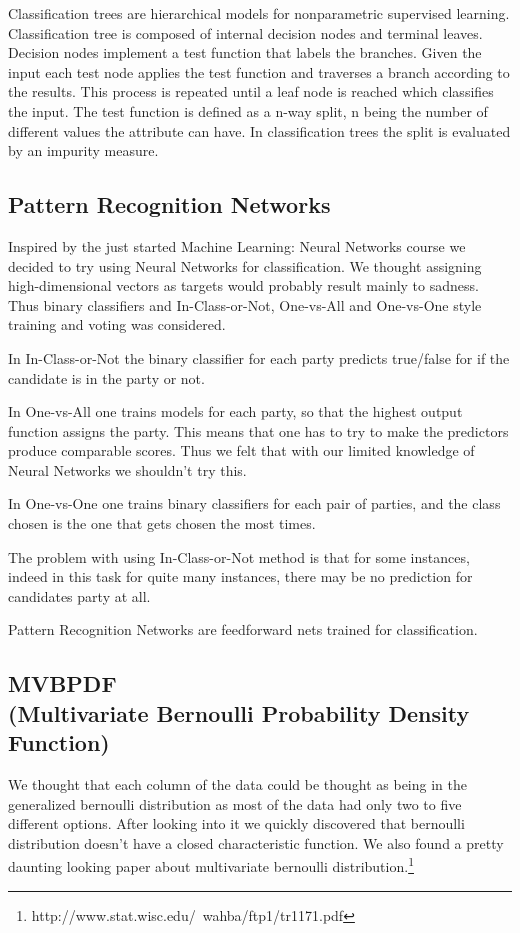 \documentclass[a4paper,10pt]{article}
\begin{document}
Classification trees are hierarchical models for nonparametric supervised learning. Classification tree is composed of internal decision nodes and terminal leaves. Decision nodes implement a test function that labels the branches. Given the input each test node applies the test function and traverses a branch according to the results. This process is repeated until a leaf node is reached which classifies the input. The test function is defined as a n-way split, n being the number of different values the attribute can have. In classification trees the split is evaluated by an impurity measure.

\subsection{Pattern Recognition Networks}
Inspired by the just started Machine Learning: Neural Networks course we decided to try using Neural Networks for classification. We thought assigning high-dimensional vectors as targets would probably result mainly to sadness. Thus binary classifiers and In-Class-or-Not, One-vs-All and One-vs-One style training and voting was considered.


In In-Class-or-Not the binary classifier for each party predicts true/false for if the candidate is in the party or not.

In One-vs-All one trains models for each party, so that the highest output function assigns the party. This means that one has to try to make the predictors produce comparable scores. Thus we felt that with our limited knowledge of Neural Networks we shouldn’t try this.

In One-vs-One one trains binary classifiers for each pair of parties, and the class chosen is the one that gets chosen the most times.


The problem with using In-Class-or-Not method is that for some instances, indeed in this task for quite many instances, there may be no prediction for candidates party at all.

Pattern Recognition Networks are feedforward nets trained for classification.

\subsection{MVBPDF\\ {\small (Multivariate Bernoulli Probability Density Function)}}
We thought that each column of the data could be thought as being in the generalized bernoulli distribution as most of the data had only two to five different options. After looking into it we quickly discovered that bernoulli distribution doesn’t have a closed characteristic function. We also found a pretty daunting looking paper about multivariate bernoulli distribution.\footnote{http://www.stat.wisc.edu/~wahba/ftp1/tr1171.pdf}
\end{document}
